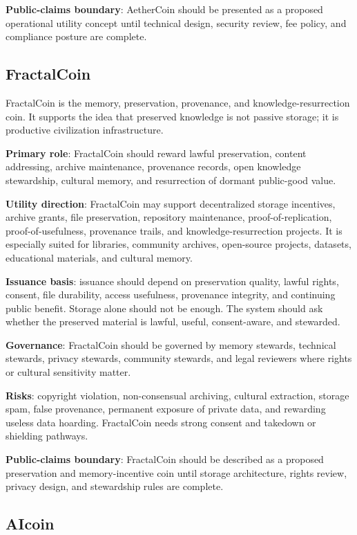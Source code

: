 \documentclass[12pt]{article}
\begin{document}
\textbf{Public-claims boundary}: AetherCoin should be presented as a proposed operational utility concept until technical design, security review, fee policy, and compliance posture are complete.

\subsection{FractalCoin}

FractalCoin is the memory, preservation, provenance, and knowledge-resurrection coin. It supports the idea that preserved knowledge is not passive storage; it is productive civilization infrastructure.

\textbf{Primary role}: FractalCoin should reward lawful preservation, content addressing, archive maintenance, provenance records, open knowledge stewardship, cultural memory, and resurrection of dormant public-good value.

\textbf{Utility direction}: FractalCoin may support decentralized storage incentives, archive grants, file preservation, repository maintenance, proof-of-replication, proof-of-usefulness, provenance trails, and knowledge-resurrection projects. It is especially suited for libraries, community archives, open-source projects, datasets, educational materials, and cultural memory.

\textbf{Issuance basis}: issuance should depend on preservation quality, lawful rights, consent, file durability, access usefulness, provenance integrity, and continuing public benefit. Storage alone should not be enough. The system should ask whether the preserved material is lawful, useful, consent-aware, and stewarded.

\textbf{Governance}: FractalCoin should be governed by memory stewards, technical stewards, privacy stewards, community stewards, and legal reviewers where rights or cultural sensitivity matter.

\textbf{Risks}: copyright violation, non-consensual archiving, cultural extraction, storage spam, false provenance, permanent exposure of private data, and rewarding useless data hoarding. FractalCoin needs strong consent and takedown or shielding pathways.

\textbf{Public-claims boundary}: FractalCoin should be described as a proposed preservation and memory-incentive coin until storage architecture, rights review, privacy design, and stewardship rules are complete.

\subsection{AIcoin}
\end{document}
